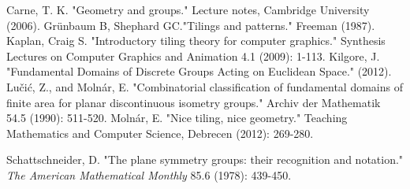 \documentclass[12pt]{report}
\begin{document}
\renewcommand\bibname{Литература}
\begin{thebibliography}{}

  Carne, T. K.  "Geometry and groups." Lecture notes, Cambridge University (2006). 
Grünbaum B, Shephard GC."Tilings and patterns." Freeman (1987).
   Kaplan, Craig S. "Introductory tiling theory for computer graphics."{} Synthesis Lectures on Computer Graphics and Animation 4.1 (2009): 1-113. 
   Kilgore, J. "Fundamental Domains of Discrete Groups Acting on Euclidean Space." (2012). 
  Lučić, Z., and Molnár, E. "{}Combinatorial classification of fundamental domains of finite area for planar discontinuous isometry groups." Archiv der Mathematik 54.5 (1990): 511-520.
 Molnár, E. "Nice tiling, nice geometry." Teaching Mathematics and Computer Science, Debrecen (2012): 269-280.


  Schattschneider, D. "The plane symmetry groups: their recognition
  and notation." \emph{The American Mathematical Monthly} 85.6 (1978):
  439-450.



\end{thebibliography}





	
\end{document}

